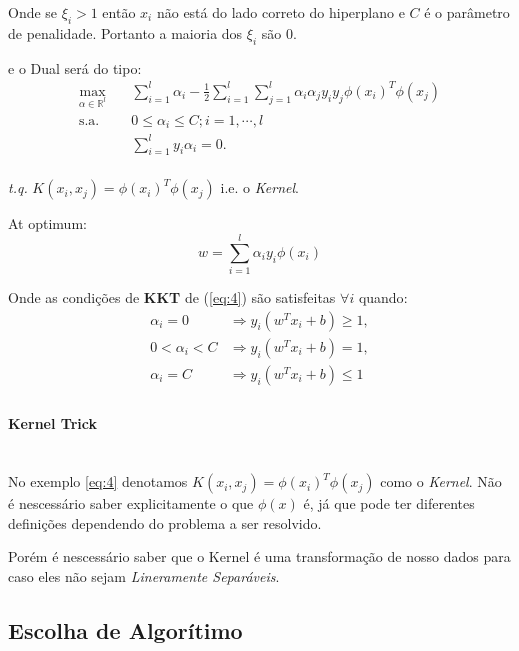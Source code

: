 \documentclass{article}
\begin{document}
Onde se \(\xi_i>1\) então \(x_i\) não está do lado correto do hiperplano e \(C\) é o parâmetro de penalidade. Portanto a maioria dos \(\xi_i\) são 0.

e o Dual será do tipo:
\begin{equation}\label{eq:4} %
\begin{aligned}
\max_{\alpha\in \mathbb{R}^l} \quad &\sum_{i=1}^{l}\alpha_i-\frac{1}{2}\sum_{i=1}^{l}\sum_{j=1}^{l}\alpha_i\alpha_j y_i y_j\phi(x_i)^T\phi(x_j)\\
\textrm{s.a.} \quad & 0\leq\alpha_i\leq C;i=1,\cdots,l\\
  &\sum_{i=1}^{l}y_i\alpha_i=0. \\
  \end{aligned}
\end{equation}

\textit{t.q.} \(K(x_i,x_j)=\phi(x_i)^T\phi(x_j)\) i.e. o \textit{Kernel}.

At optimum:
\[w = \sum_{i=1}^{l}\alpha_i y_i\phi(x_i)\]


Onde as condições de \textbf{KKT} de (\ref{eq:4}) são satisfeitas \(\forall i\) quando\cite{platt}:
\[\begin{aligned}\alpha_i = 0&\Rightarrow y_i (w^Tx_i+b)\geq1,\\
0<\alpha_i<C&\Rightarrow y_i(w^Tx_i+b)=1,\\
\alpha_i=C&\Rightarrow y_i (w^Tx_i+b)\leq1\\
\end{aligned}\]


\paragraph{Kernel Trick}\hspace{0pt}\\

No exemplo \ref{eq:4} denotamos \(K(x_i,x_j)=\phi(x_i)^T\phi(x_j)\) como o \textit{Kernel}. Não é nescessário saber explicitamente o que \(\phi(x)\) é, já que pode ter diferentes definições dependendo do problema a ser resolvido.

Porém é nescessário saber que o Kernel é uma transformação de nosso dados para caso eles não sejam \textit{Lineramente Separáveis}.
\subsection{Escolha de Algorítimo}
\end{document}

